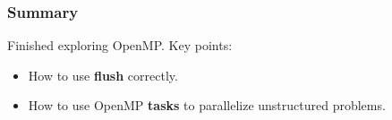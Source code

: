 \begin{frame}
  \frametitle{Summary}

  
    Finished exploring OpenMP. Key points:
  \begin{itemize}
    \item How to use {\bf flush} correctly.
    \item How to use OpenMP {\bf tasks} to parallelize unstructured problems.
  \end{itemize}
  
\end{frame}




